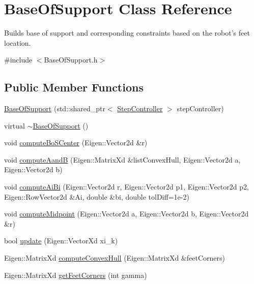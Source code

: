\hypertarget{classBaseOfSupport}{\section{\-Base\-Of\-Support \-Class \-Reference}
\label{classBaseOfSupport}
}


\-Builds base of support and corresponding constraints based on the robot's feet location.  




{\ttfamily \#include $<$\-Base\-Of\-Support.\-h$>$}

\subsection*{\-Public \-Member \-Functions}
\begin{DoxyCompactItemize}
\item 
\hyperlink{classBaseOfSupport_a2490d7d641608be3b85c903de83313cc}{\-Base\-Of\-Support} (std\-::shared\-\_\-ptr$<$ \hyperlink{classStepController}{\-Step\-Controller} $>$ step\-Controller)
\item 
virtual \hyperlink{classBaseOfSupport_a8f2261d4d25cd677d0114df426dfbfa7}{$\sim$\-Base\-Of\-Support} ()
\item 
void \hyperlink{classBaseOfSupport_af88e70d87098060a46e4a6fc9c876a22}{compute\-Bo\-S\-Center} (\-Eigen\-::\-Vector2d \&r)
\item 
void \hyperlink{classBaseOfSupport_ac0e7a364ac0ac945469a34d12ab3c9f4}{compute\-Aand\-B} (\-Eigen\-::\-Matrix\-Xd \&list\-Convex\-Hull, \-Eigen\-::\-Vector2d a, \-Eigen\-::\-Vector2d b)
\item 
void \hyperlink{classBaseOfSupport_a09b197a9869db126658d227532c1e03a}{compute\-Ai\-Bi} (\-Eigen\-::\-Vector2d r, \-Eigen\-::\-Vector2d p1, \-Eigen\-::\-Vector2d p2, \-Eigen\-::\-Row\-Vector2d \&\-Ai, double \&bi, double tol\-Diff=1e-\/2)
\item 
void \hyperlink{classBaseOfSupport_ad9a709f6df002662bfd67982a2c0e201}{compute\-Midpoint} (\-Eigen\-::\-Vector2d a, \-Eigen\-::\-Vector2d b, \-Eigen\-::\-Vector2d \&r)
\item 
bool \hyperlink{classBaseOfSupport_af7907a87712c10c72f812f0304c013e4}{update} (\-Eigen\-::\-Vector\-Xd xi\-\_\-k)
\item 
\-Eigen\-::\-Matrix\-Xd \hyperlink{classBaseOfSupport_ae98c5398e4c53666e324c1fcfb1ef167}{compute\-Convex\-Hull} (\-Eigen\-::\-Matrix\-Xd \&feet\-Corners)
\item 
\-Eigen\-::\-Matrix\-Xd \hyperlink{classBaseOfSupport_afc033ba8e5530f667f90ae539adb27f3}{get\-Feet\-Corners} (int gamma)
\end{DoxyCompactItemize}
